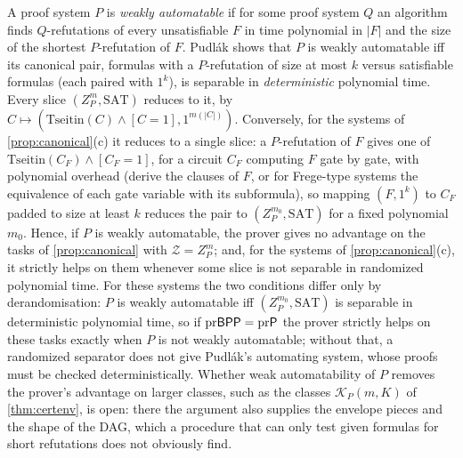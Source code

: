 A proof system $P$ is \emph{weakly automatable} if for some proof system $Q$ an
algorithm finds $Q$-refutations of every unsatisfiable $F$ in time polynomial in
$|F|$ and the size of the shortest $P$-refutation of $F$. Pudl\'ak
\cite{pudlak2003pairs} shows that $P$ is weakly automatable iff its canonical pair,
formulas with a $P$-refutation of size at most $k$ versus satisfiable formulas
(each paired with $1^k$), is separable in \emph{deterministic} polynomial time.
Every slice $(Z_P^m,\mathrm{SAT})$ reduces to it, by
$C\mapsto(\mathrm{Tseitin}(C)\wedge[C=1],1^{m(|C|)})$. Conversely, for the systems of
\cref{prop:canonical}(c) it reduces to a single slice: a $P$-refutation of $F$ gives
one of $\mathrm{Tseitin}(C_F)\wedge[C_F=1]$, for a circuit $C_F$ computing $F$ gate by
gate, with polynomial overhead (derive the clauses of $F$, or for Frege-type systems
the equivalence of each gate variable with its subformula), so mapping $(F,1^k)$ to
$C_F$ padded to size at least $k$ reduces the pair to $(Z_P^{m_0},\mathrm{SAT})$ for
a fixed polynomial $m_0$. Hence, if $P$ is weakly automatable, the prover gives no
advantage on the tasks of \cref{prop:canonical} with $\mathcal Z=Z_P^m$; and, for the
systems of \cref{prop:canonical}(c), it strictly helps on them whenever some slice is
not separable in randomized polynomial time. For these systems the two conditions
differ only by derandomisation: $P$ is weakly automatable iff
$(Z_P^{m_0},\mathrm{SAT})$ is separable in deterministic polynomial time, so if
$\mathrm{pr}\mathsf{BPP}=\mathrm{pr}\mathsf{P}$ the prover strictly helps on these tasks exactly
when $P$ is not weakly automatable; without that, a randomized separator does not
give Pudl\'ak's automating system, whose proofs must be checked deterministically.
Whether weak automatability of $P$ removes the prover's advantage on larger classes,
such as the classes
$\mathcal K_P(m,K)$ of \cref{thm:certenv}, is open: there the argument also
supplies the envelope pieces and the shape of the DAG, which a procedure that can
only test given formulas for short refutations does not obviously find.

